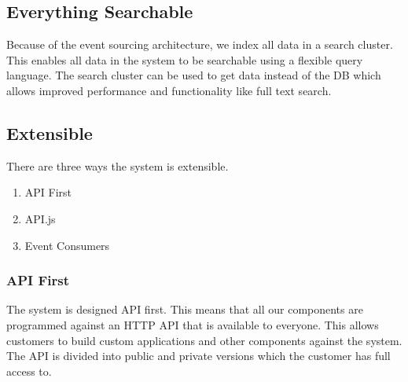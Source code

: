 \documentclass[11pt]{article}
\begin{document}

\subsection{Everything Searchable}

Because of the event sourcing architecture, we index all data in a search cluster.
This enables all data in the system to be searchable using a flexible query language.
The search cluster can be used to get data instead of the DB which allows improved
performance and functionality like full text search.

\subsection{Extensible}

There are three ways the system is extensible. 
\begin{enumerate}
    \item API First
    \item API.js
    \item Event Consumers
\end{enumerate}

\subsubsection{API First}

The system is designed API first. This means that all our components are programmed 
against an HTTP API that is available to everyone. This allows customers to build custom 
applications and other components against the system. The API is divided into public and 
private versions which the customer has full access to.
\end{document}
